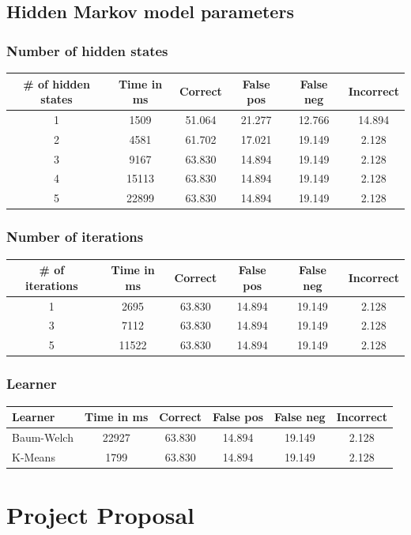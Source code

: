\documentclass[12pt,a4,notitlepage]{report}
\renewcommand{\_}{\texttt{\symbol{95}}}
\newcommand{\<}{\texttt{\symbol{60}}}
\renewcommand{\>}{\texttt{\symbol{62}}}
\begin{document}
\section{Hidden Markov model parameters}

\subsection{Number of hidden states}

\begin{tabular}{c|ccccc}
\# of hidden states & Time in ms & Correct & False pos & False neg & Incorrect \\ \hline
1 & 1509 & 51.064 & 21.277 & 12.766 & 14.894 \\
2 & 4581 & 61.702 & 17.021 & 19.149 & 2.128 \\
3 & 9167 & 63.830 & 14.894 & 19.149 & 2.128 \\
4 & 15113 & 63.830 & 14.894 & 19.149 & 2.128 \\
5 & 22899 & 63.830 & 14.894 & 19.149 & 2.128 \\
\end{tabular}

\subsection{Number of iterations}

\begin{tabular}{c|ccccc}
\# of iterations & Time in ms & Correct & False pos & False neg & Incorrect \\ \hline
1 & 2695 & 63.830 & 14.894 & 19.149 & 2.128 \\
3 & 7112 & 63.830 & 14.894 & 19.149 & 2.128 \\
5 & 11522 & 63.830 & 14.894 & 19.149 & 2.128 \\
\end{tabular}

\subsection{Learner}

\begin{tabular}{l|ccccc}
Learner & Time in ms & Correct & False pos & False neg & Incorrect \\ \hline
Baum-Welch & 22927 & 63.830 & 14.894 & 19.149 & 2.128\\
K-Means & 1799 & 63.830 & 14.894 & 19.149 & 2.128\\
\end{tabular}

\cleardoublepage

\chapter{Project Proposal}



%
\end{document}
